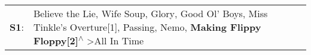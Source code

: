 \begin{supertabular}{p{0.03\textwidth}p{0.92\textwidth}}
 \textbf{S1}:  &  Believe the Lie\textsuperscript{}, \enspace Wife Soup\textsuperscript{}, \enspace Glory\textsuperscript{}, \enspace Good Ol' Boys\textsuperscript{}, \enspace Miss Tinkle's Overture[1]\textsuperscript{}, \enspace Passing\textsuperscript{}, \enspace Nemo\textsuperscript{}, \enspace \textbf{Making Flippy Floppy[2]\textsuperscript{$\wedge$}} \textgreater \enspace All In Time\textsuperscript{}  \enspace  \\
\end{supertabular}
